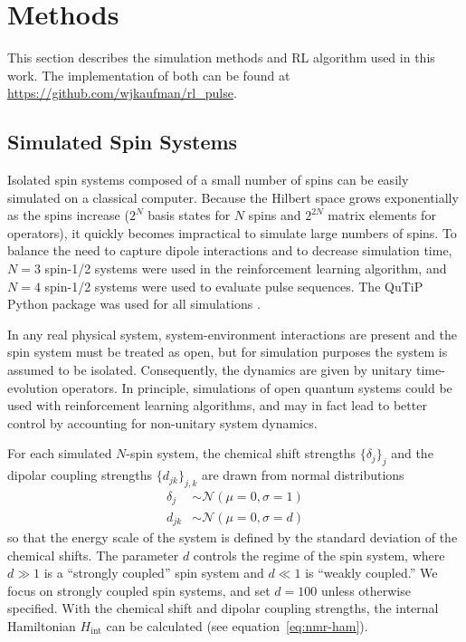 
\chapter{Methods} %



This section describes the simulation methods and RL algorithm used in this work. The implementation of both can be found at \url{https://github.com/wjkaufman/rl_pulse}.

\section{Simulated Spin Systems}

Isolated spin systems composed of a small number of spins can be easily simulated on a classical computer. Because the Hilbert space grows exponentially as the spins increase ($2^N$ basis states for $N$ spins and $2^{2N}$ matrix elements for operators), it quickly becomes impractical to simulate large numbers of spins. To balance the need to capture dipole interactions and to decrease simulation time, $N=3$ spin-1/2 systems were used in the reinforcement learning algorithm, and $N=4$ spin-1/2 systems were used to evaluate pulse sequences. The QuTiP Python package was used for all simulations \cite{Johansson_2013}.

In any real physical system, system-environment interactions are present and the spin system must be treated as open, but for simulation purposes the system is assumed to be isolated.
Consequently, the dynamics are given by unitary time-evolution operators. In principle, simulations of open quantum systems could be used with reinforcement learning algorithms, and may in fact lead to better control by accounting for non-unitary system dynamics.

For each simulated $N$-spin system, the chemical shift strengths $\{\delta_j\}_j$ and the dipolar coupling strengths $\{d_{jk}\}_{j,k}$ are drawn from normal distributions
\begin{align*}
    \delta_j &\sim \mathcal{N}(\mu=0, \sigma=1) \\
    d_{jk} &\sim \mathcal{N}(\mu=0, \sigma=d)
\end{align*}
so that the energy scale of the system is defined by the standard deviation of the chemical shifts. The parameter $d$ controls the regime of the spin system, where $d \gg 1$ is a ``strongly coupled'' spin system and $d \ll 1$ is ``weakly coupled.'' We focus on strongly coupled spin systems, and set $d = 100$ unless otherwise specified. With the chemical shift and dipolar coupling strengths, the internal Hamiltonian $H_{\text{int}}$ can be calculated (see equation~\ref{eq:nmr-ham}).

